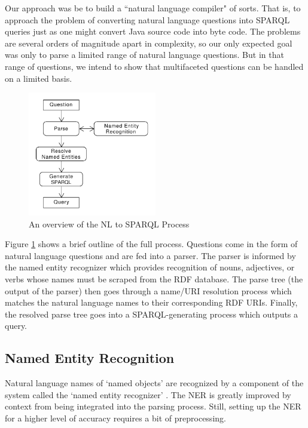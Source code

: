 \documentclass[11pt]{article}
\begin{document}
Our approach was be to build a ``natural language compiler" of sorts.
That is, to approach the problem of converting natural language questions into
SPARQL queries just as one might convert Java source code into byte code.
The problems are several orders of magnitude apart in complexity, so 
our only expected goal was only to parse a limited range of natural language questions.
But in that range of questions, we intend to show that multifaceted questions
can be handled on a limited basis.

\begin{figure}[h!]
    \centering
    \includegraphics[width=0.5\textwidth,natwidth=1,natheight=1]{umlet/usage.pdf}
    \caption{An overview of the NL to SPARQL Process}
    \label{fig:process}
\end{figure}

Figure \ref{fig:process} shows a brief outline of the full process. Questions come
in the form of natural language questions and are fed into a parser. The parser is
informed by the named entity recognizer which provides recognition of nouns, adjectives,
or verbs whose names must be scraped from the RDF database. The parse tree (the output
of the parser) then goes through a name/URI resolution process which matches the
natural language names to their corresponding RDF URIs. Finally, the resolved parse
tree goes into a SPARQL-generating process which outputs a query.

\subsection{Named Entity Recognition}
Natural language names of `named objects' are recognized by a component of the system
called the `named entity recognizer' \cite{ner1,ner2}. 
The NER is greatly improved by context from being integrated into the parsing process.
Still, setting up the NER for a higher level of accuracy requires a bit of preprocessing.
\end{document}
